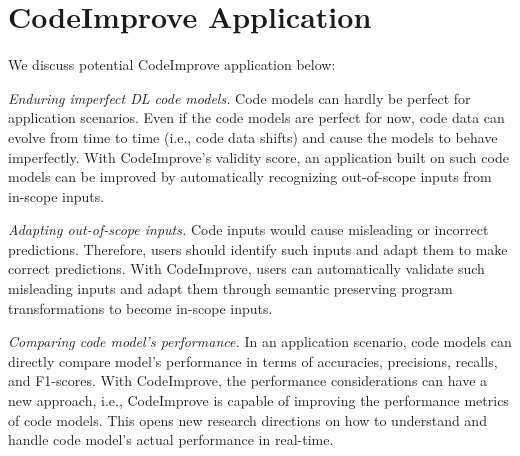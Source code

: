 \section{CodeImprove Application}
\label{applications}

We discuss potential CodeImprove application below:

\textit{Enduring imperfect DL code models.} Code models can hardly be perfect for application scenarios. Even if the code models are perfect for now, code data can evolve from time to time (i.e., code data shifts) and cause the models to behave imperfectly. With CodeImprove's validity score, an application built on such code models can be improved by automatically recognizing out-of-scope inputs from in-scope inputs. 

\textit{Adapting out-of-scope inputs. }Code inputs would cause misleading or incorrect predictions. Therefore, users should identify such inputs and adapt them to make correct predictions. With CodeImprove, users can automatically validate such misleading inputs and adapt them through semantic preserving program transformations to become in-scope inputs. 

\textit{Comparing code model's performance.} 
In an application scenario, code models can directly compare model's performance in terms of accuracies, precisions, recalls, and F1-scores. With CodeImprove, the performance considerations can have a new approach, i.e., CodeImprove is capable of improving the performance metrics of code models. This opens new research directions on how to understand and handle code model's actual performance in real-time. 









